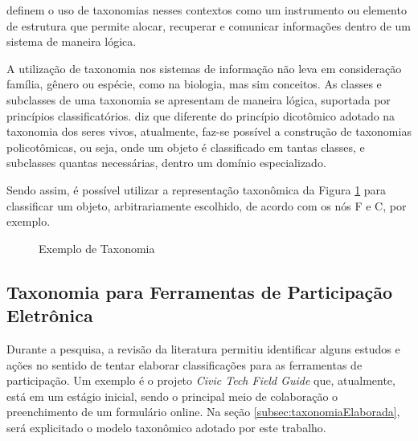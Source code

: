  definem o uso de taxonomias nesses contextos como um instrumento ou elemento de estrutura que permite alocar,
recuperar e comunicar informações dentro de um sistema de maneira lógica.

\par
A utilização de taxonomia nos sistemas de informação não leva em consideração família, gênero ou espécie, como na biologia, mas sim conceitos.
As classes e subclasses de uma taxonomia se apresentam de maneira lógica, suportada por princípios classificatórios.\cite{campos2012taxonomia}
 diz que diferente do princípio dicotômico adotado na taxonomia dos seres vivos, atualmente, faz-se possível a construção de taxonomias
policotômicas, ou seja, onde um objeto é classificado em tantas classes, e subclasses quantas necessárias, dentro um domínio especializado.

\par
Sendo assim, é possível utilizar a representação taxonômica da Figura \ref{fig:exemploTaxonomia} para classificar um objeto, arbitrariamente escolhido,
de acordo com os nós F e C, por exemplo.

\begin{figure}[!ht]
\caption{Exemplo de Taxonomia}
\label{fig:exemploTaxonomia}  
\end{figure}

\subsection{Taxonomia para Ferramentas de Participação Eletrônica}
\label{subsec:taxonomia e-part tools}
\par
Durante a pesquisa, a revisão da literatura permitiu identificar alguns estudos e ações no sentido de tentar elaborar classificações para as ferramentas de participação.
Um exemplo é o projeto \textit{Civic Tech Field Guide} que, atualmente, está em um estágio inicial, sendo o principal meio de colaboração o preenchimento de um formulário online.
Na seção \ref{subsec:taxonomiaElaborada}, será explicitado o modelo taxonômico adotado por este trabalho.

